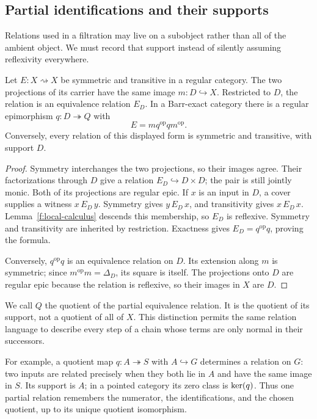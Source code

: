 \subsection{Partial identifications and their supports}

Relations used in a filtration may live on a subobject rather than all
of the ambient object. We must record that support instead of silently
assuming reflexivity everywhere.

\begin{lemma}\label{d:partial-equivalence}
Let $E:X\rightsquigarrow X$ be symmetric and transitive in a regular
category. The two projections of its carrier have the same image
$m:D\hookrightarrow X$. Restricted to $D$, the relation is an
equivalence relation $E_D$. In a Barr-exact category there is a regular
epimorphism $q:D\twoheadrightarrow Q$ with
\[
E=mq^{\mathrm{op}}qm^{\mathrm{op}}.
\]
Conversely, every relation of this displayed form is symmetric and
transitive, with support $D$.
\end{lemma}
\begin{proof}
Symmetry interchanges the two projections, so their images agree.
Their factorizations through $D$ give a relation $E_D\hookrightarrow
D\times D$; the pair is still jointly monic. Both of its projections
are regular epic. If $x$ is an input in $D$, a cover supplies a witness
$x\,E_D\,y$. Symmetry gives $y\,E_D\,x$, and transitivity gives
$x\,E_D\,x$. Lemma~\ref{f:local-calculus} descends this membership,
so $E_D$ is reflexive. Symmetry and transitivity are inherited by
restriction. Exactness gives $E_D=q^{\mathrm{op}}q$, proving the formula.

Conversely, $q^{\mathrm{op}}q$ is an equivalence relation on $D$.
Its extension along $m$ is symmetric; since $m^{\mathrm{op}}m=\Delta_D$,
its square is itself. The projections onto $D$ are regular epic
because the relation is reflexive, so their images in $X$ are $D$.
\end{proof}

We call $Q$ the quotient of the partial equivalence relation. It is
the quotient of its support, not a quotient of all of $X$. This
distinction permits the same relation language to describe every step
of a chain whose terms are only normal in their successors.

For example, a quotient map $q:A\twoheadrightarrow S$ with
$A\hookrightarrow G$ determines a relation on $G$: two inputs are
related precisely when they both lie in $A$ and have the same image
in $S$. Its support is $A$; in a pointed category its zero class is
$\operatorname{ker}(q)$. Thus one partial relation remembers the numerator, the
identifications, and the chosen quotient, up to its unique quotient
isomorphism.


